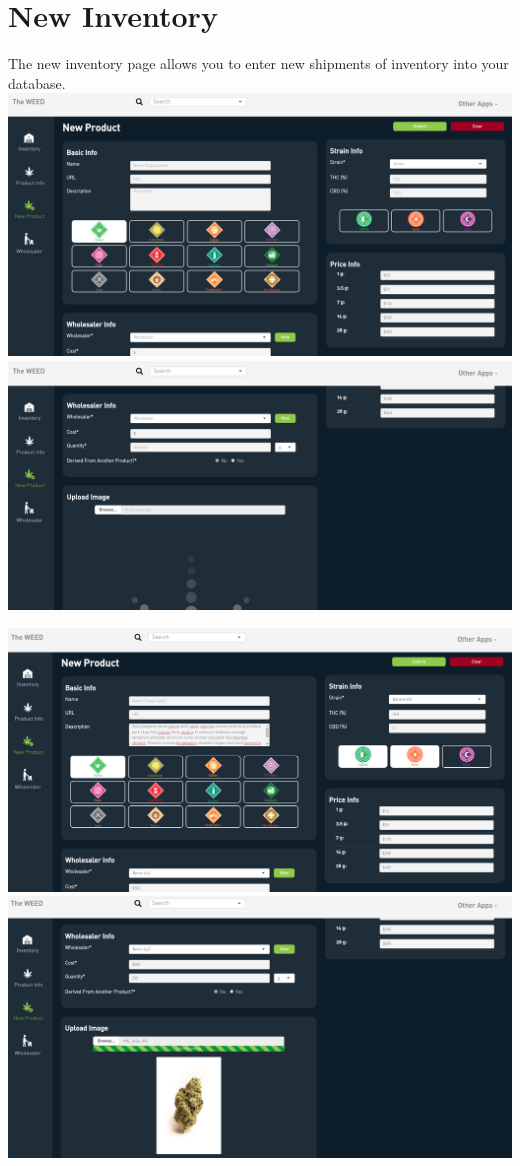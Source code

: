 \documentclass[]{book}
\theoremstyle{definition}
\theoremstyle{definition}
\theoremstyle{definition}
\theoremstyle{remark}
\begin{document}
\section{New Inventory}\label{new-inventory}

The new inventory page allows you to enter new shipments of inventory
into your database. \includegraphics{images/newInv1.png}
\includegraphics{images/newInv2.png}

\includegraphics{images/newInv3.png}
\includegraphics{images/newInv4.png}
\end{document}
